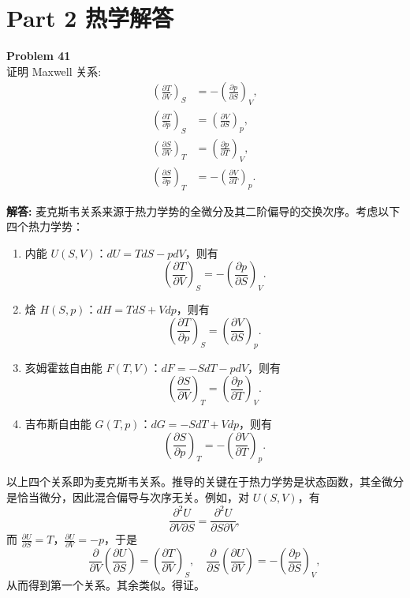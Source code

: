 \documentclass[12pt, a4paper, oneside]{ctexart}
\newenvironment{solution}{\par\noindent\textbf{解答:}\quad}{\par}
\begin{document}
\newpage
\section*{Part 2 热学解答}

\begin{mdframed}[backgroundcolor=gray!10, linewidth=0pt]
    \textbf{Problem 41} \\
    证明 Maxwell 关系:
    \[
    \begin{aligned}
        \left(\frac{\partial T}{\partial V}\right)_S &= -\left(\frac{\partial p}{\partial S}\right)_V, \\
        \left(\frac{\partial T}{\partial p}\right)_S &= \left(\frac{\partial V}{\partial S}\right)_p, \\
        \left(\frac{\partial S}{\partial V}\right)_T &= \left(\frac{\partial p}{\partial T}\right)_V, \\
        \left(\frac{\partial S}{\partial p}\right)_T &= -\left(\frac{\partial V}{\partial T}\right)_p.
    \end{aligned}
    \]
\end{mdframed}
\begin{solution}
    麦克斯韦关系来源于热力学势的全微分及其二阶偏导的交换次序。考虑以下四个热力学势：
    \begin{enumerate}
        \item 内能 $U(S, V)$：$dU = T dS - p dV$，则有
        \[
        \left(\frac{\partial T}{\partial V}\right)_S = -\left(\frac{\partial p}{\partial S}\right)_V.
        \]
        \item 焓 $H(S, p)$：$dH = T dS + V dp$，则有
        \[
        \left(\frac{\partial T}{\partial p}\right)_S = \left(\frac{\partial V}{\partial S}\right)_p.
        \]
        \item 亥姆霍兹自由能 $F(T, V)$：$dF = -S dT - p dV$，则有
        \[
        \left(\frac{\partial S}{\partial V}\right)_T = \left(\frac{\partial p}{\partial T}\right)_V.
        \]
        \item 吉布斯自由能 $G(T, p)$：$dG = -S dT + V dp$，则有
        \[
        \left(\frac{\partial S}{\partial p}\right)_T = -\left(\frac{\partial V}{\partial T}\right)_p.
        \]
    \end{enumerate}
    以上四个关系即为麦克斯韦关系。推导的关键在于热力学势是状态函数，其全微分是恰当微分，因此混合偏导与次序无关。例如，对 $U(S, V)$，有
    \[
    \frac{\partial^2 U}{\partial V \partial S} = \frac{\partial^2 U}{\partial S \partial V},
    \]
    而 $\frac{\partial U}{\partial S} = T$，$\frac{\partial U}{\partial V} = -p$，于是
    \[
    \frac{\partial}{\partial V}\left(\frac{\partial U}{\partial S}\right) = \left(\frac{\partial T}{\partial V}\right)_S, \quad
    \frac{\partial}{\partial S}\left(\frac{\partial U}{\partial V}\right) = -\left(\frac{\partial p}{\partial S}\right)_V,
    \]
    从而得到第一个关系。其余类似。得证。
\end{solution}
\end{document}
